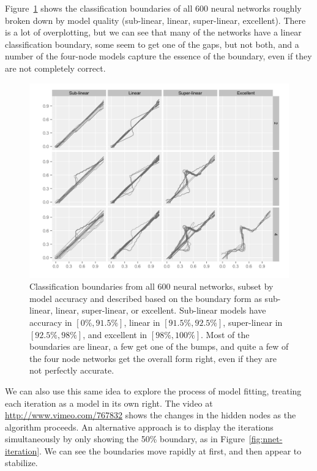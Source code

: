 \documentclass[preprint]{imsart}
\begin{document}
Figure~\ref{fig:nnet-all4} shows the classification boundaries of all 600 neural networks roughly broken down by model quality (sub-linear, linear, super-linear, excellent).  There is a lot of overplotting, but we can see that many of the networks have a linear classification boundary, some seem to get one of the gaps, but not both, and a number of the four-node models capture the essence of the boundary, even if they are not completely correct.


\begin{figure}[htbp]
  \centering
    \includegraphics[width=6.5in]{nnet-all}
  \caption{Classification boundaries from all 600 neural networks, subset by model accuracy and described based on the boundary form as sub-linear, linear, super-linear, or excellent.  Sub-linear models have accuracy in $[0\%, 91.5\%]$, linear in $[91.5\%, 92.5\%]$, super-linear in $[92.5\%, 98\%]$, and excellent in $[98\%, 100\%]$. Most of the boundaries are linear, a few get one of the bumps, and quite a few of the four node networks get the overall form right, even if they are not perfectly accurate.}
  \label{fig:nnet-all4}
\end{figure}

We can also use this same idea to explore the process of model fitting, treating each iteration as a model in its own right. The video at \url{http://www.vimeo.com/767832} shows the changes in the hidden nodes as the algorithm proceeds.  An alternative approach is to display the iterations simultaneously by only showing the 50\% boundary, as in Figure~\ref{fig:nnet-iteration}.  We can see the boundaries move rapidly at first, and then appear to stabilize.
\end{document}
